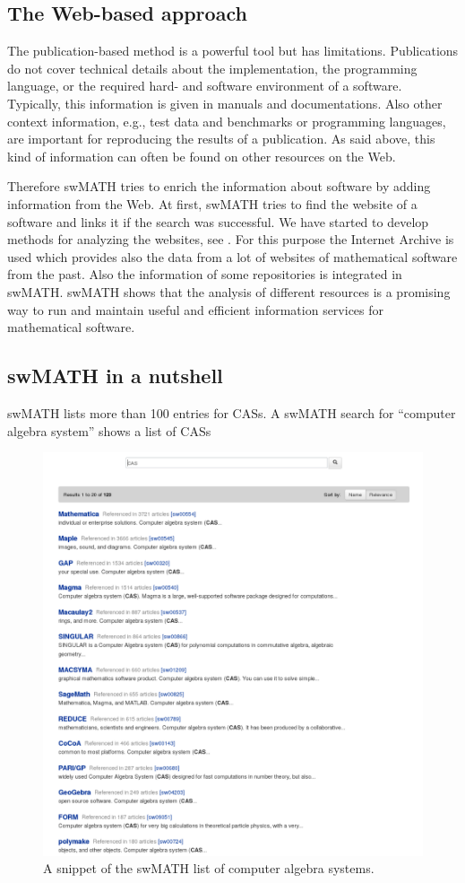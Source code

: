 \documentclass[12pt]{article}
\begin{document}
\subsection{The Web-based approach}
The publication-based method is a powerful tool but has
limitations. Publications do not cover technical details about the
implementation, the programming language, or the required hard- and software
environment of a software. Typically, this information is given in manuals and
documentations. Also other context information, e.g., test data and benchmarks
or programming languages, are important for reproducing the results of a
publication. As said above, this kind of information can often be found on
other resources on the Web.

Therefore swMATH tries to enrich the information about software by adding
information from the Web. At first, swMATH tries to find the website of a
software and links it if the search was successful.  We have started to develop
methods for analyzing the websites, see \cite{TPDL}. For this purpose the
Internet Archive \cite{IA} is used which provides also the data from a lot of
websites of mathematical software from the past.  Also the information of some
repositories is integrated in swMATH.  swMATH shows that the analysis of
different resources is a promising way to run and maintain useful and efficient
information services for mathematical software.\par


\subsection{swMATH in a nutshell}

swMATH lists more than 100 entries for CASs. A swMATH search for ``computer
algebra system'' shows a list of CASs
\begin{figure}[ht]
  \centering
  \includegraphics[width=.6\textwidth]{aca5}
  \caption{A snippet of the swMATH list of computer algebra
    systems.\label{abb_5}}
\end{figure}
\end{document}
